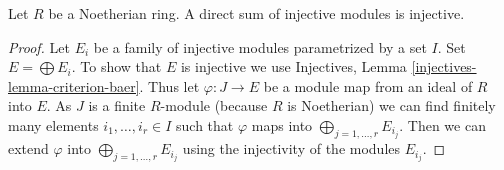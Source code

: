 \begin{lemma}
\label{lemma-sum-injective-modules}
Let $R$ be a Noetherian ring. A direct sum of injective modules
is injective.
\end{lemma}

\begin{proof}
Let $E_i$ be a family of injective modules parametrized by a set $I$.
Set $E = \bigoplus E_i$. To show that $E$ is injective we use
Injectives, Lemma \ref{injectives-lemma-criterion-baer}.
Thus let $\varphi : J \to E$ be a module map from an ideal of $R$
into $E$. As $J$ is a finite $R$-module (because $R$ is Noetherian)
we can find finitely many elements $i_1, \ldots, i_r \in I$
such that $\varphi$ maps into $\bigoplus_{j = 1, \ldots, r} E_{i_j}$.
Then we can extend $\varphi$ into $\bigoplus_{j = 1, \ldots, r} E_{i_j}$
using the injectivity of the modules $E_{i_j}$.
\end{proof}
